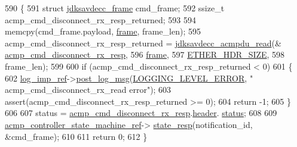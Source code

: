 \begin{DoxyCode}
590 \{
591     \textcolor{keyword}{struct }\hyperlink{structjdksavdecc__frame}{jdksavdecc\_frame} cmd\_frame;
592     ssize\_t acmp\_cmd\_disconnect\_rx\_resp\_returned;
593 
594     memcpy(cmd\_frame.payload, \hyperlink{gst__avb__playbin_8c_ac8e710e0b5e994c0545d75d69868c6f0}{frame}, frame\_len);
595     acmp\_cmd\_disconnect\_rx\_resp\_returned = \hyperlink{group__acmpdu_gaf49dbf727e31865dd891330cbdeeabc2}{jdksavdecc\_acmpdu\_read}(&
      \hyperlink{classavdecc__lib_1_1stream__input__descriptor__imp_a7572bee02b8a263009be2803e63f1790}{acmp\_cmd\_disconnect\_rx\_resp},
596                                                                   \hyperlink{gst__avb__playbin_8c_ac8e710e0b5e994c0545d75d69868c6f0}{frame},
597                                                                   \hyperlink{namespaceavdecc__lib_a6c827b1a0d973e18119c5e3da518e65ca9512ad9b34302ba7048d88197e0a2dc0}{ETHER\_HDR\_SIZE},
598                                                                   frame\_len);
599 
600     \textcolor{keywordflow}{if} (acmp\_cmd\_disconnect\_rx\_resp\_returned < 0)
601     \{
602         \hyperlink{namespaceavdecc__lib_acbe3e2a96ae6524943ca532c87a28529}{log\_imp\_ref}->\hyperlink{classavdecc__lib_1_1log_a68139a6297697e4ccebf36ccfd02e44a}{post\_log\_msg}(\hyperlink{namespaceavdecc__lib_a501055c431e6872ef46f252ad13f85cdaf2c4481208273451a6f5c7bb9770ec8a}{LOGGING\_LEVEL\_ERROR}, \textcolor{stringliteral}{"
      acmp\_cmd\_disconnect\_rx\_read error"});
603         assert(acmp\_cmd\_disconnect\_rx\_resp\_returned >= 0);
604         \textcolor{keywordflow}{return} -1;
605     \}
606 
607     status = \hyperlink{classavdecc__lib_1_1stream__input__descriptor__imp_a7572bee02b8a263009be2803e63f1790}{acmp\_cmd\_disconnect\_rx\_resp}.\hyperlink{structjdksavdecc__acmpdu_a2c237e845db12511d3ddd73770461bed}{header}.
      \hyperlink{structjdksavdecc__acmpdu__common__control__header_ade20423e91627f07e610924cb0081623}{status};
608 
609     \hyperlink{namespaceavdecc__lib_a693c2049de1d4ec860a92126b846ac21}{acmp\_controller\_state\_machine\_ref}->
      \hyperlink{classavdecc__lib_1_1acmp__controller__state__machine_affdd2e72c0e7a518e4b8993e23750aa9}{state\_resp}(notification\_id, &cmd\_frame);
610 
611     \textcolor{keywordflow}{return} 0;
612 \}
\end{DoxyCode}


